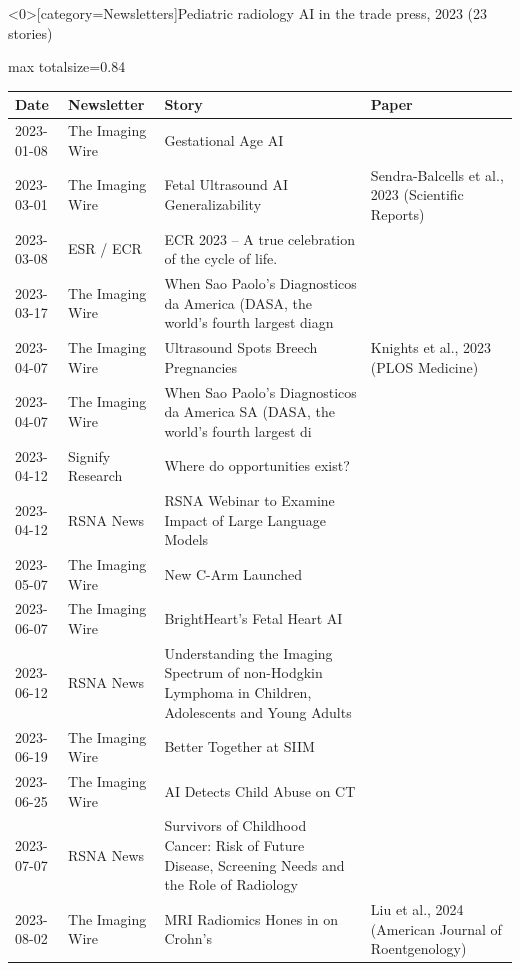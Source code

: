 \documentclass[aspectratio=169]{beamer}
\renewcommand{\arraystretch}{1.08}
\begin{document}
\begin{frame}<0>[category=Newsletters]{Pediatric radiology AI in the trade press, 2023 (23 stories)}
\tiny
\begin{adjustbox}{max totalsize={\textwidth}{0.84\textheight}}
\renewcommand{\arraystretch}{1.2}
\begin{tabular}{|l|l|>{\raggedright\arraybackslash}p{}|>{\raggedright\arraybackslash}p{}|}
\hline \textbf{Date} & \textbf{Newsletter} & \textbf{Story} & \textbf{Paper} \\ \hline
2023-01-08 & The Imaging Wire & Gestational Age AI &  \\ \hline
2023-03-01 & The Imaging Wire & Fetal Ultrasound AI Generalizability & Sendra-Balcells et al., 2023 (Scientific Reports) \\ \hline
2023-03-08 & ESR / ECR & ECR 2023 -- A true celebration of the cycle of life. &  \\ \hline
2023-03-17 & The Imaging Wire & When Sao Paolo's Diagnosticos da America (DASA, the world's fourth largest diagn &  \\ \hline
2023-04-07 & The Imaging Wire & Ultrasound Spots Breech Pregnancies & Knights et al., 2023 (PLOS Medicine) \\ \hline
2023-04-07 & The Imaging Wire & When Sao Paolo's Diagnosticos da America SA (DASA, the world's fourth largest di &  \\ \hline
2023-04-12 & Signify Research & Where do opportunities exist? &  \\ \hline
2023-04-12 & RSNA News & RSNA Webinar to Examine Impact of Large Language Models &  \\ \hline
2023-05-07 & The Imaging Wire & New C-Arm Launched &  \\ \hline
2023-06-07 & The Imaging Wire & BrightHeart's Fetal Heart AI &  \\ \hline
2023-06-12 & RSNA News & Understanding the Imaging Spectrum of non-Hodgkin Lymphoma in Children, Adolescents and Young Adults &  \\ \hline
2023-06-19 & The Imaging Wire & Better Together at SIIM &  \\ \hline
2023-06-25 & The Imaging Wire & AI Detects Child Abuse on CT &  \\ \hline
2023-07-07 & RSNA News & Survivors of Childhood Cancer: Risk of Future Disease, Screening Needs and the Role of Radiology &  \\ \hline
2023-08-02 & The Imaging Wire & MRI Radiomics Hones in on Crohn's & Liu et al., 2024 (American Journal of Roentgenology) \\ \hline

\end{tabular}
\end{adjustbox}
\end{frame}
\end{document}
